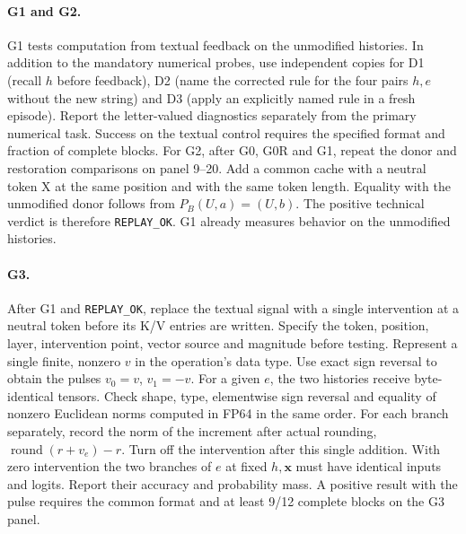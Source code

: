 \paragraph{G1 and G2.}
G1 tests computation from textual feedback on the unmodified histories. In addition to the mandatory numerical probes, use independent copies for D1 (recall $h$ before feedback), D2 (name the corrected rule for the four pairs $h,e$ without the new string) and D3 (apply an explicitly named rule in a fresh episode). Report the letter-valued diagnostics separately from the primary numerical task. Success on the textual control requires the specified format and fraction of complete blocks. For G2, after G0, G0R and G1, repeat the donor and restoration comparisons on panel 9--20. Add a common cache with a neutral token X at the same position and with the same token length. Equality with the unmodified donor follows from $P_B(U,a)=(U,b)$. The positive technical verdict is therefore \texttt{REPLAY\_OK}. G1 already measures behavior on the unmodified histories.

\paragraph{G3.}
After G1 and \texttt{REPLAY\_OK}, replace the textual signal with a single intervention at a neutral token before its K/V entries are written. Specify the token, position, layer, intervention point, vector source and magnitude before testing. Represent a single finite, nonzero $v$ in the operation's data type. Use exact sign reversal to obtain the pulses $v_0=v$, $v_1=-v$. For a given $e$, the two histories receive byte-identical tensors. Check shape, type, elementwise sign reversal and equality of nonzero Euclidean norms computed in FP64 in the same order. For each branch separately, record the norm of the increment after actual rounding, $\operatorname{round}(r+v_e)-r$. Turn off the intervention after this single addition. With zero intervention the two branches of $e$ at fixed $h,\mathbf{x}$ must have identical inputs and logits. Report their accuracy and probability mass. A positive result with the pulse requires the common format and at least 9/12 complete blocks on the G3 panel.

